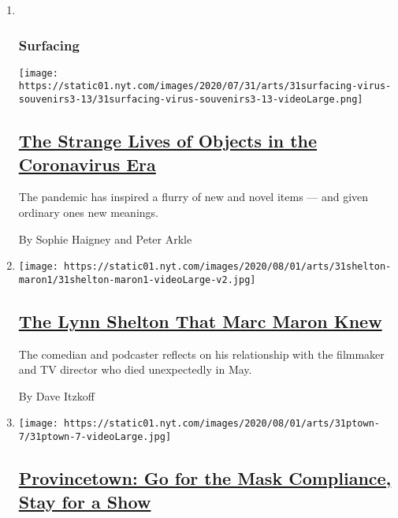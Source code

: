 \begin{enumerate}
\def\labelenumi{\arabic{enumi}.}
\item ~
  \hypertarget{surfacing}{%
  \subsubsection{Surfacing}\label{surfacing}}

  \texttt{[image: https://static01.nyt.com/images/2020/07/31/arts/31surfacing-virus-souvenirs3-13/31surfacing-virus-souvenirs3-13-videoLarge.png]}

  \hypertarget{the-strange-lives-of-objects-in-the-coronavirus-era}{%
  \subsection{\texorpdfstring{\href{/2020/08/01/arts/design/virus-design-objects.html}{The
  Strange Lives of Objects in the Coronavirus
  Era}}{The Strange Lives of Objects in the Coronavirus Era}}\label{the-strange-lives-of-objects-in-the-coronavirus-era}}

  The pandemic has inspired a flurry of new and novel items --- and
  given ordinary ones new meanings.

  By Sophie Haigney and Peter Arkle
\item
  \texttt{[image: https://static01.nyt.com/images/2020/08/01/arts/31shelton-maron1/31shelton-maron1-videoLarge-v2.jpg]}

  \hypertarget{the-lynn-shelton-that-marc-maron-knew}{%
  \subsection{\texorpdfstring{\href{/2020/07/31/movies/marc-maron-lynn-shelton.html}{The
  Lynn Shelton That Marc Maron
  Knew}}{The Lynn Shelton That Marc Maron Knew}}\label{the-lynn-shelton-that-marc-maron-knew}}

  The comedian and podcaster reflects on his relationship with the
  filmmaker and TV director who died unexpectedly in May.

  By Dave Itzkoff
\item
  \texttt{[image: https://static01.nyt.com/images/2020/08/01/arts/31ptown-7/31ptown-7-videoLarge.jpg]}

  \hypertarget{provincetown-go-for-the-mask-compliance-stay-for-a-show}{%
  \subsection{\texorpdfstring{\href{/2020/07/31/theater/provincetown-nightlife-coronavirus.html}{Provincetown:
  Go for the Mask Compliance, Stay for a
  Show}}{Provincetown: Go for the Mask Compliance, Stay for a Show}}\label{provincetown-go-for-the-mask-compliance-stay-for-a-show}}


\end{enumerate}
